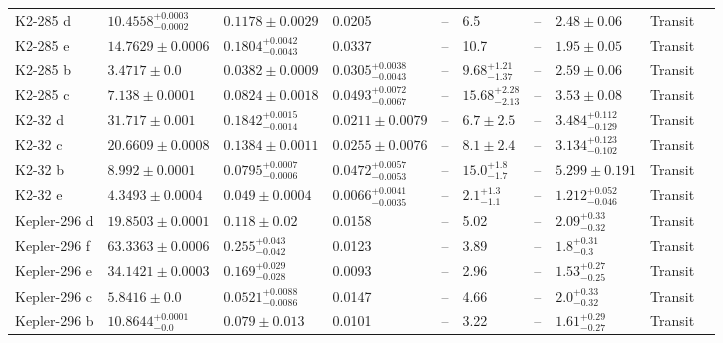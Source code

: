\begin{tabular}{llllllllll}
K2-285 d & $10.4558^{+0.0003}_{-0.0002}$ & $0.1178 \pm 0.0029$ & 0.0205 & -- & 6.5 & -- & $2.48 \pm 0.06$ & Transit & \cite{PALLE_ET_AL__2019} \\
K2-285 e & $14.7629 \pm 0.0006$ & $0.1804^{+0.0042}_{-0.0043}$ & 0.0337 & -- & 10.7 & -- & $1.95 \pm 0.05$ & Transit & \cite{PALLE_ET_AL__2019} \\
K2-285 b & $3.4717 \pm 0.0$ & $0.0382 \pm 0.0009$ & $0.0305^{+0.0038}_{-0.0043}$ & -- & $9.68^{+1.21}_{-1.37}$ & -- & $2.59 \pm 0.06$ & Transit & \cite{PALLE_ET_AL__2019} \\
K2-285 c & $7.138 \pm 0.0001$ & $0.0824 \pm 0.0018$ & $0.0493^{+0.0072}_{-0.0067}$ & -- & $15.68^{+2.28}_{-2.13}$ & -- & $3.53 \pm 0.08$ & Transit & \cite{PALLE_ET_AL__2019} \\
K2-32 d & $31.717 \pm 0.001$ & $0.1842^{+0.0015}_{-0.0014}$ & $0.0211 \pm 0.0079$ & -- & $6.7 \pm 2.5$ & -- & $3.484^{+0.112}_{-0.129}$ & Transit & \cite{LILLO_BOX_ET_AL__2020} \\
K2-32 c & $20.6609 \pm 0.0008$ & $0.1384 \pm 0.0011$ & $0.0255 \pm 0.0076$ & -- & $8.1 \pm 2.4$ & -- & $3.134^{+0.123}_{-0.102}$ & Transit & \cite{LILLO_BOX_ET_AL__2020} \\
K2-32 b & $8.992 \pm 0.0001$ & $0.0795^{+0.0007}_{-0.0006}$ & $0.0472^{+0.0057}_{-0.0053}$ & -- & $15.0^{+1.8}_{-1.7}$ & -- & $5.299 \pm 0.191$ & Transit & \cite{LILLO_BOX_ET_AL__2020} \\
K2-32 e & $4.3493 \pm 0.0004$ & $0.049 \pm 0.0004$ & $0.0066^{+0.0041}_{-0.0035}$ & -- & $2.1^{+1.3}_{-1.1}$ & -- & $1.212^{+0.052}_{-0.046}$ & Transit & \cite{LILLO_BOX_ET_AL__2020} \\
Kepler-296 d & $19.8503 \pm 0.0001$ & $0.118 \pm 0.02$ & 0.0158 & -- & 5.02 & -- & $2.09^{+0.33}_{-0.32}$ & Transit & \cite{BARCLAY_ET_AL__2015} \\
Kepler-296 f & $63.3363 \pm 0.0006$ & $0.255^{+0.043}_{-0.042}$ & 0.0123 & -- & 3.89 & -- & $1.8^{+0.31}_{-0.3}$ & Transit & \cite{BARCLAY_ET_AL__2015} \\
Kepler-296 e & $34.1421 \pm 0.0003$ & $0.169^{+0.029}_{-0.028}$ & 0.0093 & -- & 2.96 & -- & $1.53^{+0.27}_{-0.25}$ & Transit & \cite{BARCLAY_ET_AL__2015} \\
Kepler-296 c & $5.8416 \pm 0.0$ & $0.0521^{+0.0088}_{-0.0086}$ & 0.0147 & -- & 4.66 & -- & $2.0^{+0.33}_{-0.32}$ & Transit & \cite{BARCLAY_ET_AL__2015} \\
Kepler-296 b & $10.8644^{+0.0001}_{-0.0}$ & $0.079 \pm 0.013$ & 0.0101 & -- & 3.22 & -- & $1.61^{+0.29}_{-0.27}$ & Transit & \cite{BARCLAY_ET_AL__2015} \\

\end{tabular}
